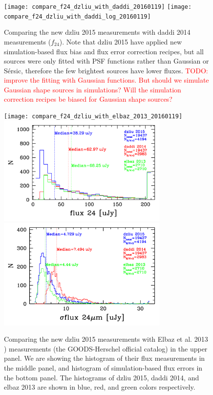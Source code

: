 \documentclass[11pt,a4paper]{article}
\begin{document}
\begin{figure}[H]
	\texttt{[image: compare\_f24\_dzliu\_with\_daddi\_20160119]}
	\texttt{[image: compare\_f24\_dzliu\_with\_daddi\_log\_20160119]}
	\caption{Comparing the new dzliu 2015 measurements with daddi 2014 measurements ($f_{24}$). Note that dzliu 2015 have applied new simulation-based flux bias and flux error correction recipes, but all sources were only fitted with PSF functions rather than Gaussian or S\'{e}rsic, therefore the few brightest sources have lower fluxes. \textcolor{red}{TODO: improve the fitting with Gaussian functions. But should we simulate Gaussian shape sources in simulations? Will the simulation correction recipes be biased for Gaussian shape sources?}}
\end{figure}

\begin{figure}[H]
	\texttt{[image: compare\_f24\_dzliu\_with\_elbaz\_2013\_20160119]}
	\includegraphics[width=0.75\textwidth]{compare_f24_histogram_dzliu_daddi_elbaz_20160124}
	\includegraphics[width=0.75\textwidth]{compare_df24_histogram_dzliu_daddi_elbaz_20160124}
	\caption{\label{Fig_compare_f24_with_elbaz_2013}
		Comparing the new dzliu 2015 measurements with Elbaz et al. 2013 {)} measurements (the GOODS-Herschel official catalog) in the upper panel. We are showing the histogram of their flux measurements in the middle panel, and histogram of simulation-based flux errors in the bottom panel. The histograms of dzliu 2015, daddi 2014, and elbaz 2013 are shown in blue, red, and green colors respectively. }
\end{figure}
\end{document}
